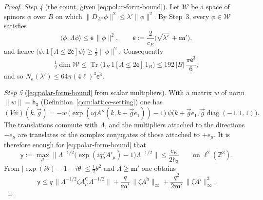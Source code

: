 \documentclass[11pt,letterpaper,reqno]{amsart}
\theoremstyle{definition}
\begin{document}
\begin{proof}
\emph{Step 4} (the count, given \eqref{eq:polar-form-bound}).
Let $\mathcal W$ be a space of spinors $\phi$ over $B$ on which $\|D_{A''}\phi\|^2\le\lambda'\|\phi\|^2$.
By Step~3, every $\phi\in\mathcal W$ satisfies
\begin{equation*}
\langle\phi,\Lambda\phi\rangle\le\mathsf e\,\|\phi\|^2,\qquad\mathsf e:=\frac{2}{c_E}\bigl(\sqrt{\lambda'}+\mathbf m'\bigr),
\end{equation*}
and hence $\langle\phi,\allowbreak 1[\Lambda\le2\mathsf e]\phi\rangle\ge\frac12\|\phi\|^2$.
Consequently
\begin{equation*}
\tfrac12\dim\mathcal W\le\operatorname{Tr}\bigl(1_B\,1[\Lambda\le2\mathsf e]\,1_B\bigr)\le192\,|B|\,\frac{\pi\mathsf e^3}{6},
\end{equation*}
and so $N_a(\lambda')\le64\pi(4\ell)^3\mathsf e^3$.

\emph{Step 5} (\eqref{eq:polar-form-bound} from scalar multipliers).
With a matrix $w$ of norm $\|w\|=\mathsf h_3$ (Definition~\ref{qcm:lattice-setting}) one has
\begin{equation*}
(V\psi)(k,\vec g)=-w\,\bigl(\exp(iqA''(k,k+\vec ge_1))-1\bigr)\,\psi\bigl(k+\vec ge_1,\vec g\operatorname{diag}(-1,1,1)\bigr).
\end{equation*}
The translations commute with $\Lambda$, and the multipliers attached to the directions $-e_\mu$ are translates of the complex conjugates of those attached to $+e_\mu$.
It is therefore enough for \eqref{eq:polar-form-bound} that
\begin{equation*}
\mathsf y:=\max_\mu\bigl\|\Lambda^{-1/2}\bigl(\exp(iq\zeta A'_\mu)-1\bigr)\Lambda^{-1/2}\bigr\|\le\frac{c_E}{2\mathsf h_3}\qquad\text{on }\ell^2(\mathbb Z^3).
\end{equation*}
From $|\exp(i\theta)-1-i\theta|\le\frac12\theta^2$ and $\Lambda\ge\mathbf m'$ one obtains
\begin{equation*}
\mathsf y\le q\,\|\Lambda^{-1/2}\zeta A^{\mathrm C}_\mu\Lambda^{-1/2}\|+\frac{q}{\mathbf m'}\,\|\zeta A^{\mathrm h}\|_\infty+\frac{q^2}{2\mathbf m'}\,\|\zeta A'\|^2_\infty.
\end{equation*}


\end{proof}
\end{document}
